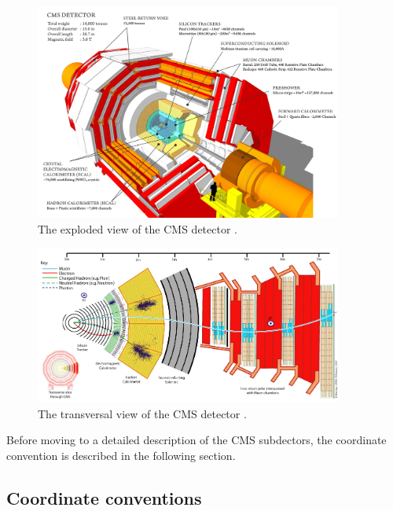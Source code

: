 \begin{figure}[h!]
\begin{center}
\includegraphics[width=0.9\textwidth]{figures/CMS/cms.png}
\caption{The exploded view of the CMS detector \cite{CMS_Detector1}.}
\label{fig:CMS_overview}
\end{center}
\end{figure}

\begin{figure}[h!]
\begin{center}
\includegraphics[width=0.9\textwidth]{figures/CMS/cms_particles.png}
\caption{The transversal view of the CMS detector \cite{CMS_Detector2}.}
\label{fig:CMS_transversal}
\end{center}
\end{figure}



Before moving to a detailed description of the CMS subdectors, the coordinate convention is described in the following section.
\subsection{Coordinate conventions}\label{subsec:CMS_Coordinate}

